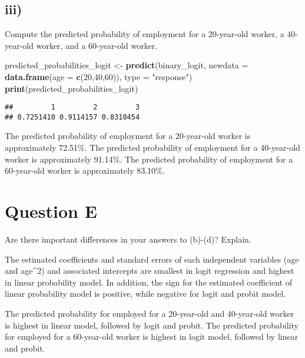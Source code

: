 \documentclass[
]{article}
\newenvironment{Shaded}{\begin{snugshade}}{\end{snugshade}}
\newcommand{\AttributeTok}[1]{\textcolor[rgb]{0.13,0.29,0.53}{#1}}
\newcommand{\DecValTok}[1]{\textcolor[rgb]{0.00,0.00,0.81}{#1}}
\newcommand{\FunctionTok}[1]{\textcolor[rgb]{0.13,0.29,0.53}{\textbf{#1}}}
\newcommand{\NormalTok}[1]{#1}
\newcommand{\OtherTok}[1]{\textcolor[rgb]{0.56,0.35,0.01}{#1}}
\newcommand{\StringTok}[1]{\textcolor[rgb]{0.31,0.60,0.02}{#1}}
\begin{document}
\hypertarget{iii-2}{%
\subsection{iii)}\label{iii-2}}

Compute the predicted probability of employment for a 20-year-old
worker, a 40-year-old worker, and a 60-year-old worker.

\begin{Shaded}
\begin{Highlighting}[]
\NormalTok{predicted\_probabilities\_logit }\OtherTok{\textless{}{-}} \FunctionTok{predict}\NormalTok{(binary\_logit, }
                                         \AttributeTok{newdata =} \FunctionTok{data.frame}\NormalTok{(}\AttributeTok{age =} \FunctionTok{c}\NormalTok{(}\DecValTok{20}\NormalTok{,}\DecValTok{40}\NormalTok{,}\DecValTok{60}\NormalTok{)), }
                                         \AttributeTok{type =} \StringTok{"response"}\NormalTok{)}
\FunctionTok{print}\NormalTok{(predicted\_probabilities\_logit)}
\end{Highlighting}
\end{Shaded}

\begin{verbatim}
##         1         2         3 
## 0.7251410 0.9114157 0.8310454
\end{verbatim}

The predicted probability of employment for a 20-year-old worker is
approximately 72.51\%. The predicted probability of employment for a
40-year-old worker is approximately 91.14\%. The predicted probability
of employment for a 60-year-old worker is approximately 83.10\%.

\hypertarget{question-e}{%
\section{Question E}\label{question-e}}

Are there important differences in your answers to (b)-(d)? Explain.
\vspace{1em}

The estimated coefficients and standard errors of each independent
variables (age and age\^{}2) and associated intercepts are smallest in
logit regression and highest in linear probability model. In addition,
the sign for the estimated coefficient of linear probability model is
positive, while negative for logit and probit model.

The predicted probability for employed for a 20-year-old and 40-year-old
worker is highest in linear model, followed by logit and probit. The
predicted probability for employed for a 60-year-old worker is highest
in logit model, followed by linear and probit.
\end{document}
